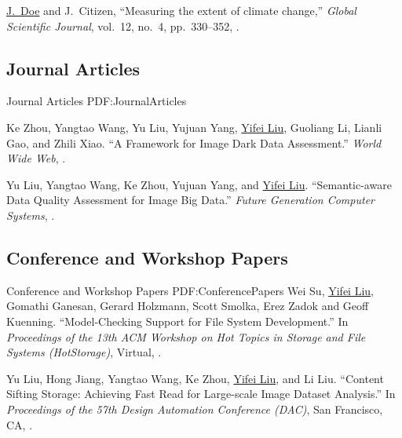 \documentclass[letterpaper,10pt,oneside]{article}
\begin{document}
\begin{body}
\Gap
\NumberedItem{{\CharSpace}[1]}
{\underline{J.~Doe} and J.~Citizen,
``Measuring the extent of climate change,''
\textit{Global Scientific Journal},
vol.~12,
no.~4,
pp.~330--352,
.}
\fi


\subsection
{Journal Articles}
{Journal Articles}
{PDF:JournalArticles}
\GapNoBreak

\NumberedItem{[1]}
Ke Zhou, Yangtao Wang, Yu Liu, Yujuan Yang, \underline{Yifei Liu}, Guoliang Li, Lianli Gao, and Zhili Xiao.
``A Framework for Image Dark Data Assessment.'' 
\textit{World Wide Web},
.

\BigGap
\NumberedItem{[2]}
Yu Liu, Yangtao Wang, Ke Zhou, Yujuan Yang, and \underline{Yifei Liu}.
``Semantic-aware Data Quality Assessment for Image Big Data.'' 
\textit{Future Generation Computer Systems},
.
\GapNoBreak

\subsection
{Conference and Workshop Papers}
{Conference and Workshop Papers}
{PDF:ConferencePapers}
\GapNoBreak
\NumberedItem{[1]}
Wei Su, \underline{Yifei Liu}, Gomathi Ganesan, Gerard Holzmann, Scott Smolka, Erez Zadok and Geoff Kuenning.
``Model-Checking Support for File System Development.''
In \textit{Proceedings of the 13th ACM Workshop on Hot Topics in Storage and File Systems (HotStorage)}, Virtual,
.

\BigGap
\NumberedItem{[2]}
Yu Liu, Hong Jiang, Yangtao Wang, Ke Zhou, \underline{Yifei Liu}, and Li Liu.
``Content Sifting Storage: Achieving Fast Read for Large-scale Image Dataset Analysis.''
In \textit{Proceedings of the 57th Design Automation Conference (DAC)}, San Francisco, CA,
.


\end{body}
\end{document}
